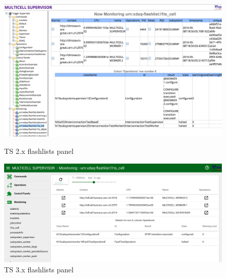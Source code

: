 \begin{figure}[H]
  \centering
  \includegraphics[width=\textwidth]{images/ts2_flashlists}
  \caption{TS 2.x flashlists panel}
  \label{fig:ts2_flashlists}
  \centering
  \includegraphics[width=\textwidth]{images/ts3_flashlists}
  \caption{TS 3.x flashlists panel}
  \label{fig:ts3_flashlists}
\end{figure}
